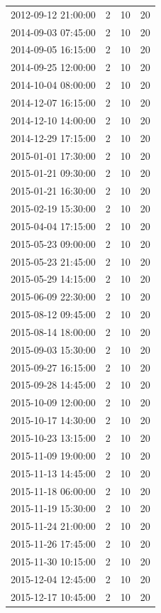 \begin{tabular}{lrrr}
2012-09-12 21:00:00 & 2 & 10 & 20 \\
2014-09-03 07:45:00 & 2 & 10 & 20 \\
2014-09-05 16:15:00 & 2 & 10 & 20 \\
2014-09-25 12:00:00 & 2 & 10 & 20 \\
2014-10-04 08:00:00 & 2 & 10 & 20 \\
2014-12-07 16:15:00 & 2 & 10 & 20 \\
2014-12-10 14:00:00 & 2 & 10 & 20 \\
2014-12-29 17:15:00 & 2 & 10 & 20 \\
2015-01-01 17:30:00 & 2 & 10 & 20 \\
2015-01-21 09:30:00 & 2 & 10 & 20 \\
2015-01-21 16:30:00 & 2 & 10 & 20 \\
2015-02-19 15:30:00 & 2 & 10 & 20 \\
2015-04-04 17:15:00 & 2 & 10 & 20 \\
2015-05-23 09:00:00 & 2 & 10 & 20 \\
2015-05-23 21:45:00 & 2 & 10 & 20 \\
2015-05-29 14:15:00 & 2 & 10 & 20 \\
2015-06-09 22:30:00 & 2 & 10 & 20 \\
2015-08-12 09:45:00 & 2 & 10 & 20 \\
2015-08-14 18:00:00 & 2 & 10 & 20 \\
2015-09-03 15:30:00 & 2 & 10 & 20 \\
2015-09-27 16:15:00 & 2 & 10 & 20 \\
2015-09-28 14:45:00 & 2 & 10 & 20 \\
2015-10-09 12:00:00 & 2 & 10 & 20 \\
2015-10-17 14:30:00 & 2 & 10 & 20 \\
2015-10-23 13:15:00 & 2 & 10 & 20 \\
2015-11-09 19:00:00 & 2 & 10 & 20 \\
2015-11-13 14:45:00 & 2 & 10 & 20 \\
2015-11-18 06:00:00 & 2 & 10 & 20 \\
2015-11-19 15:30:00 & 2 & 10 & 20 \\
2015-11-24 21:00:00 & 2 & 10 & 20 \\
2015-11-26 17:45:00 & 2 & 10 & 20 \\
2015-11-30 10:15:00 & 2 & 10 & 20 \\
2015-12-04 12:45:00 & 2 & 10 & 20 \\
2015-12-17 10:45:00 & 2 & 10 & 20 \\

\end{tabular}
